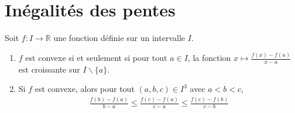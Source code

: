 \documentclass[../main.tex]{subfiles}
\begin{document}
\section{Inégalités des pentes}
\begin{tcolorbox}[title=Propostion 19.8, title filled=false, colframe=lightblue, colback=lightblue!10!white]
    Soit $f:I\to \mathbb{R}$ une fonction définie sur un intervalle $I$. 
    \begin{enumerate}
        \item $f$ est convexe si et seulement si pour tout $a \in I$, la fonction $x\mapsto \frac{f(x) - f(a)}{x - a}$ est croissante sur $I\backslash\{a\}$. 
        \item Si $f$ est convexe, alors pour tout $(a, b, c) \in I^3$ avec $a < b < c$, 
        \begin{align*}
            \frac{f(b) - f(a)}{b-a} \leq \frac{f(c) - f(a)}{c-a} \leq \frac{f(c) - f(b)}{c-b}
        \end{align*}
    \end{enumerate}
\end{tcolorbox}
\end{document}
